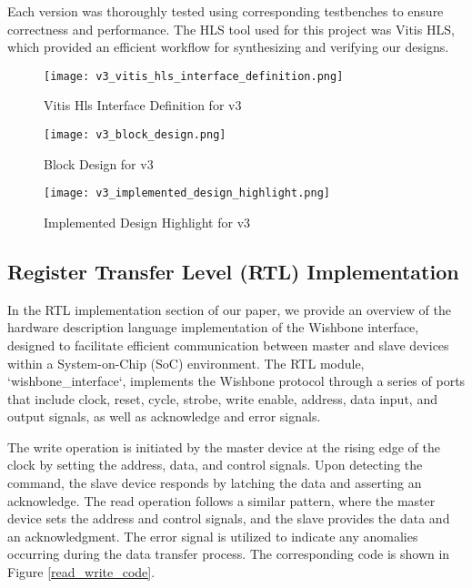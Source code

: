 \documentclass[conference]{IEEEtran}
\begin{document}
Each version was thoroughly tested using corresponding testbenches to ensure correctness and performance. The HLS tool used for this project was Vitis HLS, which provided an efficient workflow for synthesizing and verifying our designs.


\begin{figure}[htbp]
    \centering
    \texttt{[image: v3\_vitis\_hls\_interface\_definition.png]}
    \caption{Vitis Hls Interface Definition for v3}
    \label{v3_vitis_hls_interface_definition}
\end{figure}

\begin{figure}[htbp]
    \centering
    \texttt{[image: v3\_block\_design.png]}
    \caption{Block Design for v3}
    \label{fig:v3_block_design}
\end{figure}

\begin{figure}[htbp]
    \centering
    \texttt{[image: v3\_implemented\_design\_highlight.png]}
    \caption{Implemented Design Highlight for v3}
    \label{fig:v3_implemented_design_highlight}
\end{figure}

\subsection{Register Transfer Level (RTL) Implementation}
In the RTL implementation section of our paper, we provide an overview of the hardware description language implementation of the Wishbone interface, designed to facilitate efficient communication between master and slave devices within a System-on-Chip (SoC) environment. The RTL module, `wishbone\_interface`, implements the Wishbone protocol through a series of ports that include clock, reset, cycle, strobe, write enable, address, data input, and output signals, as well as acknowledge and error signals.

The write operation is initiated by the master device at the rising edge of the clock by setting the address, data, and control signals. Upon detecting the command, the slave device responds by latching the data and asserting an acknowledge. The read operation follows a similar pattern, where the master device sets the address and control signals, and the slave provides the data and an acknowledgment. The error signal is utilized to indicate any anomalies occurring during the data transfer process. The corresponding code is shown in Figure \ref{read_write_code}.
\end{document}
